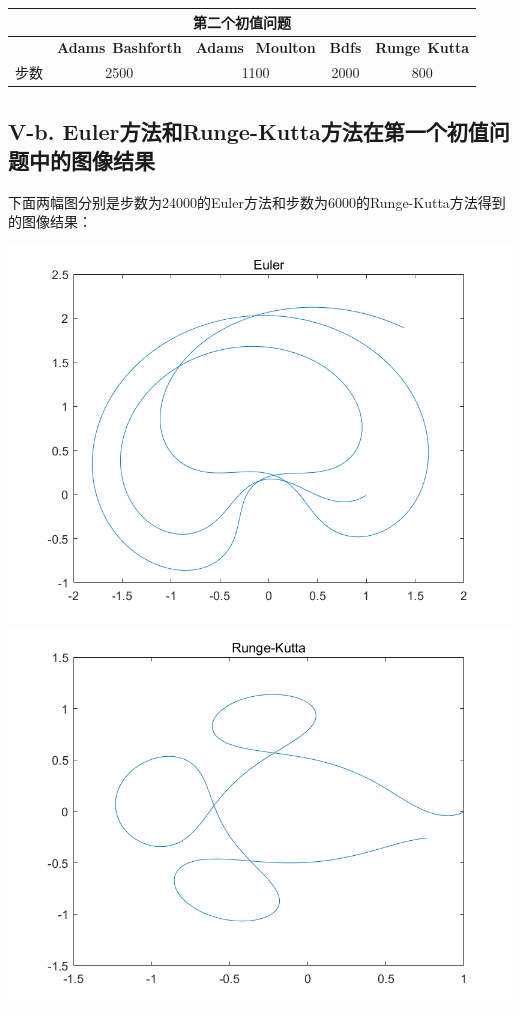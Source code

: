 \documentclass[twoside,a4paper]{article}
\begin{document}
\newpage

\centering
\renewcommand{\arraystretch}{1.5}
\begin{tabular}{|c|c|c|c|c|}
    \multicolumn{5}{c}{\textbf{第二个初值问题}}                                                                                    \\
    \hline
         & \textbf{Adams}\ \textbf{Bashforth} & \textbf{Adams} \ \textbf{Moulton} & \textbf{Bdfs} & \textbf{Runge}\ \textbf{Kutta} \\
    \hline
    步数 & 2500                               & 1100                              & 2000          & 800                            \\
    \hline
\end{tabular}

\raggedright
\subsection*{V-b. Euler方法和Runge-Kutta方法在第一个初值问题中的图像结果}
\hspace{0.8em}
下面两幅图分别是步数为24000的Euler方法和步数为6000的Runge-Kutta方法得到的图像结果：

\centering
\includegraphics[scale=0.6]{../png/Euler.png}
\includegraphics[scale=0.6]{../png/Runge-Kutta.png}
\end{document}
